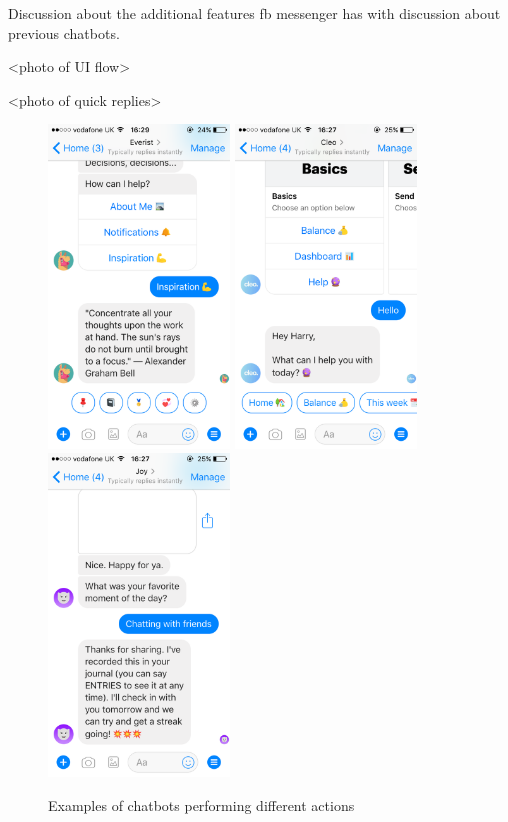 Discussion about the additional features fb messenger has with discussion about previous chatbots.

<photo of UI flow>

<photo of quick replies>

\begin{figure}[H]
  \centering
  \includegraphics[width=1.9in]{../resources/existing-bots/everist.png}
  \hspace{10px}
  \includegraphics[width=1.9in]{../resources/existing-bots/cleo.png}
  \hspace{10px}
  \includegraphics[width=1.9in]{../resources/existing-bots/joy-ai.png}
  \caption{Examples of chatbots performing different actions}
  \label{fig:chatbots_examples}
\end{figure}


